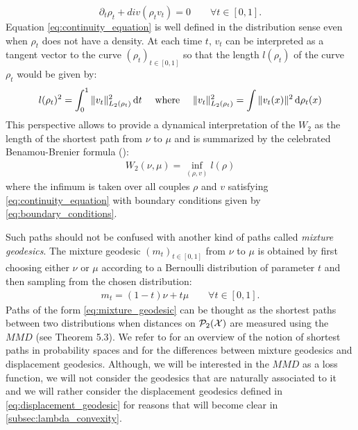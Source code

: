 \begin{equation}\label{eq:continuity_equation}
\partial_t \rho_t + div(\rho_t v_t ) = 0 \qquad \forall t\in[0,1].
\end{equation}
Equation \cref{eq:continuity_equation} is well defined in the distribution sense even when $\rho_t$ does not have a density. At each time $t$, $v_t$ can be interpreted as a tangent vector to the curve $(\rho_t)_{t\in[0,1]}$ so that the length $l(\rho_t)$ of the curve $\rho_t$ would be given by:
\begin{equation}
l(\rho_t)^2 = \int_0^1 \Vert v_t \Vert^2_{L_2(\rho_t)} \mathop{}\!\mathrm{d} t \quad \text{ where } \quad 
\Vert v_t \Vert^2_{L_2(\rho_t)} =  \int \Vert v_t(x) \Vert^2 \mathop{}\!\mathrm{d} \rho_t(x)
\end{equation}
This perspective allows to provide a dynamical interpretation of the $W_2$ as the length  of the shortest path from $\nu$ to $\mu$ and is summarized by the celebrated Benamou-Brenier formula (\cite{benamou2000computational}):
\begin{align}\label{eq:benamou-brenier-formula}
W_2(\nu,\mu) = \inf_{(\rho,v)} l(\rho)
\end{align}
where the infimum is taken  over all couples  $\rho$ and $v$ satisfying  \cref{eq:continuity_equation}  with boundary conditions given by \cref{eq:boundary_conditions}.

\begin{remark}
	Such paths should not be confused with another kind of paths called \textit{mixture geodesics}. The mixture geodesic $(m_t)_{t\in[0,1]}$ from $\nu$ to $\mu$ is obtained by first choosing either $\nu$ or $\mu$ according to a Bernoulli distribution of parameter $t$ and then sampling from the chosen distribution:
	\begin{align}\label{eq:mixture_geodesic}
	m_t = (1-t)\nu + t\mu \qquad \forall t \in [0,1].
	\end{align}
	Paths of the form \cref{eq:mixture_geodesic} can be thought as the shortest paths between two distributions when distances on $\mathcal{P}_2({{\mathcal X}})$ are measured using the $MMD$ (see \cite{Bottou:2017} Theorem 5.3). We refer to \cite{Bottou:2017} for an overview of the notion of shortest paths in probability spaces and for the differences between mixture geodesics and displacement geodesics.
	Although, we will be interested in the $MMD$ as a loss function, we will not consider the geodesics that are naturally associated to it and we will rather consider the displacement geodesics defined in \cref{eq:displacement_geodesic} for reasons that will become clear in \cref{subsec:lambda_convexity}.
\end{remark}



